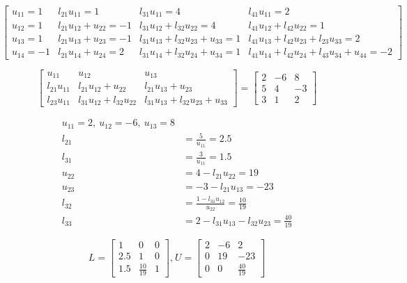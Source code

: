 \documentclass[a4paper, 12pt]{report}
\begin{document}
{\begin{equation*}
\begin{bmatrix}
u_{11}=1& l_{21}u_{11}=1& l_{31}u_{11}=4& l_{41}u_{11}=2\\
u_{12}=1& l_{21}u_{12}+u_{22}=-1& l_{31}u_{12}+l_{32}u_{22}=4& l_{41}u_{12}+l_{42}u_{22}=1\\
u_{13}=1& l_{21}u_{13}+u_{23}=-1& l_{31}u_{13}+l_{32}u_{23}+u_{33}=1& l_{41}u_{13}+l_{42}u_{23}+l_{23}u_{33}=2\\
u_{14}=-1& l_{21}u_{14}+u_{24}=2& l_{31}u_{14}+l_{32}u_{24}+u_{34}=1& l_{41}u_{14}+l_{42}u_{24}+l_{43}u_{34}+u_{44}=-2
\end{bmatrix}
\end{equation*}

\begin{equation*}
\begin{bmatrix}
u_{11}& u_{12}& u_{13}\\
l_{21}u_{11}& l_{21}u_{12}+u_{22}& l_{21}u_{13}+u_{23}\\
l_{23}u_{11}& l_{31}u_{12}+l_{32}u_{22}& l_{31}u_{13}+l_{32}u_{23}+u_{33}
\end{bmatrix}
=
\begin{bmatrix}
2& -6& 8\\
5& 4& -3\\
3& 1& 2
\end{bmatrix}
\end{equation*}

\begin{align*}
u_{11}=2,\ u_{12}=-6,\ u_{13}=8\\
l_{21}&=\frac{5}{u_{11}}=2.5\\
l_{31}&=\frac{3}{u_{11}}=1.5\\
u_{22}&=4-l_{21}u_{22}=19\\
u_{23}&=-3-l_{21}u_{13}=-23\\
l_{32}&=\frac{1-l_{31}u_{12}}{u_{22}}=\frac{10}{19}\\
l_{33}&=2-l_{31}u_{13}-l_{32}u_{23}=\frac{40}{19}
\end{align*}

\begin{equation*}
L=
\begin{bmatrix}
1& 0& 0\\
2.5& 1& 0\\
1.5& \frac{10}{19}& 1
\end{bmatrix}
\text{,}\ U=
\begin{bmatrix}
2& -6& 2\\
0& 19& -23\\
0& 0& \frac{40}{19}
\end{bmatrix}
\end{equation*}

}
\end{document}
